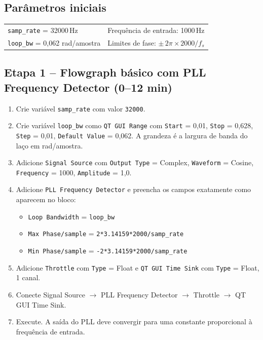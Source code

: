 \documentclass[11pt,a4paper]{article}
\begin{document}
\subsection*{Parâmetros iniciais}

\begin{center}
\begin{tabular}{l l}
  \texttt{samp\_rate} = 32000\,Hz & Frequência de entrada: 1000\,Hz \\
  \texttt{loop\_bw} = 0{,}062 rad/amostra & Limites de fase: $\pm\,2\pi \times 2000/f_s$ \\
\end{tabular}
\end{center}

\subsection*{Etapa 1 -- Flowgraph básico com PLL Frequency Detector (0--12 min)}

\begin{instrucao}
\begin{enumerate}[label=\arabic*.]
  \item Crie variável \texttt{samp\_rate} com valor \texttt{32000}.
  \item Crie variável \texttt{loop\_bw} como \texttt{QT GUI Range} com
    \texttt{Start} = 0{,}01, \texttt{Stop} = 0{,}628, \texttt{Step} = 0{,}01,
    \texttt{Default Value} = 0{,}062. A grandeza é a largura de banda do
    laço em rad/amostra.
  \item Adicione \texttt{Signal Source} com \texttt{Output Type} = Complex,
    \texttt{Waveform} = Cosine, \texttt{Frequency} = 1000, \texttt{Amplitude}
    = 1{,}0.
  \item Adicione \texttt{PLL Frequency Detector} e preencha os campos
    exatamente como aparecem no bloco:
    \begin{itemize}
      \item \texttt{Loop Bandwidth} = \texttt{loop\_bw}
      \item \texttt{Max Phase/sample} = \texttt{2*3.14159*2000/samp\_rate}
      \item \texttt{Min Phase/sample} = \texttt{-2*3.14159*2000/samp\_rate}
    \end{itemize}
  \item Adicione \texttt{Throttle} com \texttt{Type} = Float e
    \texttt{QT GUI Time Sink} com \texttt{Type} = Float, 1 canal.
  \item Conecte Signal Source $\to$ PLL Frequency Detector $\to$ Throttle
    $\to$ QT GUI Time Sink.
  \item Execute. A saída do PLL deve convergir para uma constante
    proporcional à frequência de entrada.
\end{enumerate}
\end{instrucao}
\end{document}

